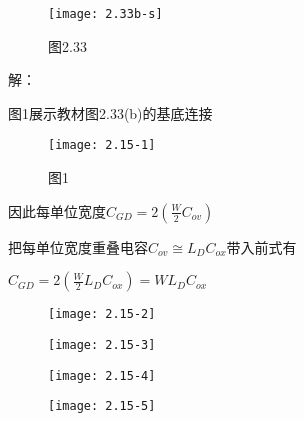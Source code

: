




		\begin{figure}[H] %
	\begin{minipage}{\linewidth}
		\texttt{[image: 2.33b-s]}
	\end{minipage}
	\caption*{图2.33} %
\end{figure}

解：

图1展示教材图2.33(b)的基底连接

		\begin{figure}[H] %
	\begin{minipage}{\linewidth}
		\texttt{[image: 2.15-1]}
	\end{minipage}
	\caption*{图1} %
\end{figure}

因此每单位宽度$C_{GD}=2(\frac{W}{2}C_{ov})$

把每单位宽度重叠电容$C_{ov}\cong L_DC_{ox}$带入前式有

$C_{GD}=2(\frac{W}{2}L_DC_{ox})=WL_DC_{ox}$

\begin{figure}[H] %
	\begin{minipage}{\linewidth}
		\texttt{[image: 2.15-2]}
	\end{minipage}
\end{figure}


\begin{figure}[H] %
	\begin{minipage}{\linewidth}
		\texttt{[image: 2.15-3]}
	\end{minipage}
\end{figure}


\begin{figure}[H] %
	\begin{minipage}{\linewidth}
		\texttt{[image: 2.15-4]}
	\end{minipage}
\end{figure}

\begin{figure}[H] %
	\begin{minipage}{\linewidth}
		\texttt{[image: 2.15-5]}
	\end{minipage}
\end{figure}


